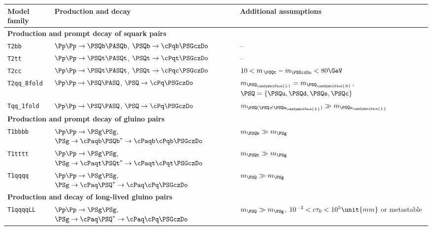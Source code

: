 \begingroup
\renewcommand*{\arraystretch}{1.2}
\begin{table}[!t]
  \label{tab:sms}
  \centering
  \begin{tabular}{ lll }
    \hline
    Model family
    & Production and decay
    & Additional assumptions                                                         \\
    \hline
    \multicolumn{3}{l}{\bf Production and prompt decay of squark pairs}           \\
    \texttt{T2bb}
    & $\Pp\Pp \to \PSQb\PASQb$,
    $\PSQb \to \cPqb\PSGczDo$
    & --                                                                             \\
    \texttt{T2tt}
    & $\Pp\Pp \to \PSQt\PASQt$,
    $\PSQt \to \cPqt\PSGczDo$
    & --                                                                             \\
    \texttt{T2cc}
    & $\Pp\Pp \to \PSQt\PASQt$,
    $\PSQt\to \cPqc\PSGczDo$
    & $10 < m_{\,\PSQt} - m_{\PSGczDo} < 80\GeV$                                     \\
    \texttt{T2qq\_8fold}
    & $\Pp\Pp \to \PSQ\PASQ$,
    $\PSQ \to \cPq\PSGczDo$
    & $m_{\PSQ_\cmsSymbolFace{L}} = m_{\PSQ_\cmsSymbolFace{R}}$,
    $\PSQ = \{ \PSQu, \PSQd, \PSQs, \PSQc \}$                                     \\
    \texttt{Tqq\_1fold}
    & $\Pp\Pp \to \PSQ\PASQ$,
    $\PSQ \to \cPq\PSGczDo$
    & $m_{\PSQ (\PSQ \neq \PSQu_\cmsSymbolFace{L})} \gg m_{\PSQu_\cmsSymbolFace{L}}$ \\
    \multicolumn{3}{l}{\bf Production and prompt decay of gluino pairs}           \\
    \texttt{T1bbbb}
    & $\Pp\Pp \to \PSg\PSg$,
    $\PSg\to \cPaqb\PSQb^* \to \cPaqb\cPqb\PSGczDo$
    & $m_{\PSQb} \gg m_{\PSg}$                                                       \\
    \texttt{T1tttt}
    & $\Pp\Pp \to \PSg\PSg$,
    $\PSg\to \cPaqt\PSQt^* \to \cPaqt\cPqt\PSGczDo$                                                                   
    & $m_{\PSQt} \gg m_{\PSg}$                                                       \\
    \texttt{T1qqqq}
    & $\Pp\Pp \to \PSg\PSg$,
    $\PSg\to \cPaq\PSQ^* \to \cPaq\cPq\PSGczDo$                                                                   
    & $m_{\PSQ} \gg m_{\PSg}$                                                        \\
    \multicolumn{3}{l}{\bf Production and decay of long-lived gluino pairs}       \\
    \texttt{T1qqqqLL}
    & $\Pp\Pp \to \PSg\PSg$,
    $\PSg \to \cPaq\PSQ^* \to \cPaq\cPq\PSGczDo$    
    & $m_{\PSQ} \gg m_{\PSg}$, $10^{-3} < \ctau < 10^{5}\unit{mm}$ or metastable    \\
    \hline
  \end{tabular}
\end{table}
\endgroup 


